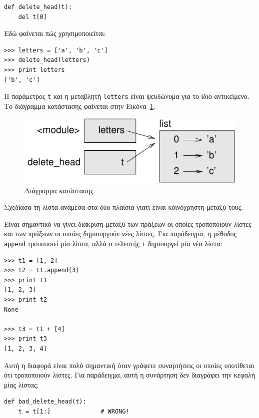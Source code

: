 \documentclass[10pt]{book}
\begin{document}
\begin{verbatim}
def delete_head(t):
    del t[0]
\end{verbatim}
%
 
Εδώ φαίνεται πώς χρησιμοποιείται:	

\begin{verbatim}
>>> letters = ['a', 'b', 'c']
>>> delete_head(letters)
>>> print letters
['b', 'c']
\end{verbatim}
%
 
Η παράμετρος {\tt t} και η μεταβλητή {\tt letters} είναι ψευδώνυμα για το ίδιο αντικείμενο. Το διάγραμμα κατάστασης φαίνεται στην Εικόνα~\ref{fig.stack5}.

\begin{figure}
\centerline
{\includegraphics[scale=0.8]{figs/stack5.pdf}}
 \caption{Διάγραμμα κατάστασης.} 
\label{fig.stack5}
\end{figure}


Σχεδίασα τη λίστα ανάμεσα στα δύο πλαίσια γιατί είναι κοινόχρηστη μεταξύ τους.

Είναι σημαντικό να γίνει διάκριση μεταξύ των πράξεων οι οποίες τροποποιούν λίστες και των πράξεων οι οποίες δημιουργούν νέες λίστες. Για παράδειγμα, η μέθοδος {\tt append} τροποποιεί μία λίστα, αλλά ο τελεστής {\tt +} δημιουργεί μία νέα λίστα:

\begin{verbatim}
>>> t1 = [1, 2]
>>> t2 = t1.append(3)
>>> print t1
[1, 2, 3]
>>> print t2
None

>>> t3 = t1 + [4]
>>> print t3
[1, 2, 3, 4]
\end{verbatim}

 
Αυτή η διαφορά είναι πολύ σημαντική όταν γράφετε συναρτήσεις οι οποίες υποτίθεται ότι τροποποιούν λίστες. Για παράδειγμα, αυτή η συνάρτηση δεν διαγράφει την κεφαλή μίας λίστας:

\begin{verbatim}
def bad_delete_head(t):
    t = t[1:]              # WRONG!
\end{verbatim}
\end{document}

